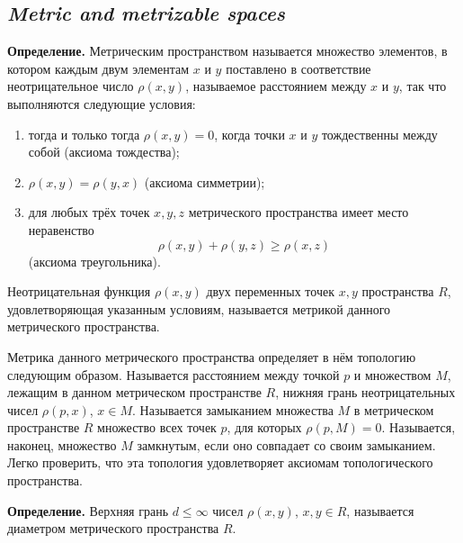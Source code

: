 \subsection*{ \textit{Metric and metrizable spaces}}
\begin{rusblock}
\textbf{Определение.} Метрическим пространством называется множество элементов, в котором каждым двум элементам $x$ и $y$ поставлено в соответствие неотрицательное число $\rho(x,y)$, называемое расстоянием между $x$ и $y$, так что выполняются следующие условия:
\begin{enumerate}[leftmargin=2.2em]
\item тогда и только тогда $\rho(x,y)=0$, когда точки $x$ и $y$ тождественны между собой (аксиома тождества);
\item $\rho(x,y)=\rho(y,x)$ (аксиома симметрии);
\item для любых трёх точек $x,y,z$ метрического пространства имеет место неравенство
\[
\rho(x,y)+\rho(y,z)\ge\rho(x,z)
\]
(аксиома треугольника).
\end{enumerate}
Неотрицательная функция $\rho(x,y)$ двух переменных точек $x,y$ пространства $R$, удовлетворяющая указанным условиям, называется метрикой данного метрического пространства.

Метрика данного метрического пространства определяет в нём топологию следующим образом. Называется расстоянием между точкой $p$ и множеством $M$, лежащим в данном метрическом пространстве $R$, нижняя грань неотрицательных чисел $\rho(p,x)$, $x\in M$. Называется замыканием множества $M$ в метрическом пространстве $R$ множество всех точек $p$, для которых $\rho(p,M)=0$. Называется, наконец, множество $M$ замкнутым, если оно совпадает со своим замыканием. Легко проверить, что эта топология удовлетворяет аксиомам топологического пространства.

\textbf{Определение.} Верхняя грань $d\le\infty$ чисел $\rho(x,y)$, $x,y\in R$, называется диаметром метрического пространства $R$.
\end{rusblock}

